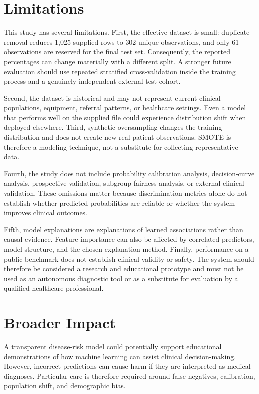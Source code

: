 \documentclass[10pt]{article}
\begin{document}
\section{Limitations}
This study has several limitations. First, the effective dataset is small: duplicate removal reduces 1,025 supplied rows to 302 unique observations, and only 61 observations are reserved for the final test set. Consequently, the reported percentages can change materially with a different split. A stronger future evaluation should use repeated stratified cross-validation inside the training process and a genuinely independent external test cohort.

Second, the dataset is historical and may not represent current clinical populations, equipment, referral patterns, or healthcare settings. Even a model that performs well on the supplied file could experience distribution shift when deployed elsewhere. Third, synthetic oversampling changes the training distribution and does not create new real patient observations. SMOTE is therefore a modeling technique, not a substitute for collecting representative data.

Fourth, the study does not include probability calibration analysis, decision-curve analysis, prospective validation, subgroup fairness analysis, or external clinical validation. These omissions matter because discrimination metrics alone do not establish whether predicted probabilities are reliable or whether the system improves clinical outcomes.

Fifth, model explanations are explanations of learned associations rather than causal evidence. Feature importance can also be affected by correlated predictors, model structure, and the chosen explanation method. Finally, performance on a public benchmark does not establish clinical validity or safety. The system should therefore be considered a research and educational prototype and must not be used as an autonomous diagnostic tool or as a substitute for evaluation by a qualified healthcare professional.


\section{Broader Impact}
A transparent disease-risk model could potentially support educational demonstrations of how machine learning can assist clinical decision-making. However, incorrect predictions can cause harm if they are interpreted as medical diagnoses. Particular care is therefore required around false negatives, calibration, population shift, and demographic bias.
\end{document}
